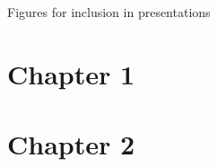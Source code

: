 \documentclass{beamer}
\begin{document}
\begin{frame}{Figures for inclusion in presentations}
  \tableofcontents
\end{frame}

\section{Chapter 1}
\def\thisDir{ch01-intro}


\section{Chapter 2}
\def\thisDir{ch02-qlogms}

\begin{fig}
  
\end{fig}

\begin{fig}
  
\end{fig}

\begin{fig}
  
\end{fig}

\begin{fig}
  
\end{fig}

\begin{fig}

\end{fig}

\begin{fig}

\end{fig}

\begin{fig}

\end{fig}

\begin{fig}

\end{fig}

\begin{fig}

\end{fig}

\begin{fig}

\end{fig}
\end{document}
